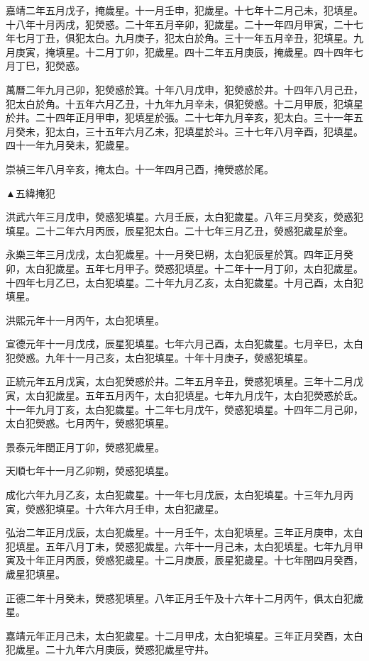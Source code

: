 \begin{pinyinscope}
嘉靖二年五月戊子，掩歲星。十一月壬申，犯歲星。十七年十二月己未，犯填星。十八年十月丙戌，犯熒惑。二十年五月辛卯，犯歲星。二十一年四月甲寅，二十七年七月丁丑，俱犯太白。九月庚子，犯太白於角。三十一年五月辛丑，犯填星。九月庚寅，掩填星。十二月丁卯，犯歲星。四十二年五月庚辰，掩歲星。四十四年七月丁巳，犯熒惑。

萬曆二年九月己卯，犯熒惑於箕。十年八月戊申，犯熒惑於井。十四年八月己丑，犯太白於角。十五年六月乙丑，十九年九月辛未，俱犯熒惑。十二月甲辰，犯填星於井。二十四年正月甲申，犯填星於張。二十七年九月辛亥，犯太白。三十一年五月癸未，犯太白，三十五年六月乙未，犯填星於斗。三十七年八月辛酉，犯填星。四十一年九月癸未，犯歲星。

崇禎三年八月辛亥，掩太白。十一年四月己酉，掩熒惑於尾。

▲五緯掩犯

洪武六年三月戊申，熒惑犯填星。六月壬辰，太白犯歲星。八年三月癸亥，熒惑犯填星。二十二年六月丙辰，辰星犯太白。二十七年三月乙丑，熒惑犯歲星於奎。

永樂三年三月戊戌，太白犯歲星。十一月癸巳朔，太白犯辰星於箕。四年正月癸卯，太白犯歲星。五年七月甲子。熒惑犯填星。十二年十一月丁卯，太白犯歲星。十四年七月乙巳，太白犯填星。二十年九月乙亥，太白犯歲星。十月己酉，太白犯填星。

洪熙元年十一月丙午，太白犯填星。

宣德元年十一月戊戌，辰星犯填星。七年六月己酉，太白犯歲星。七月辛巳，太白犯熒惑。九年十一月己亥，太白犯填星。十年十月庚子，熒惑犯填星。

正統元年五月戊寅，太白犯熒惑於井。二年五月辛丑，熒惑犯填星。三年十二月戊寅，太白犯歲星。五年五月丙午，太白犯填星。七年九月戊午，太白犯熒惑於氐。十一年九月丁亥，太白犯歲星。十二年七月戊午，熒惑犯填星。十四年二月己卯，太白犯熒惑。七月丙午，熒惑犯填星。

景泰元年閏正月丁卯，熒惑犯歲星。

天順七年十一月乙卯朔，熒惑犯填星。

成化六年九月乙亥，太白犯歲星。十一年七月戊辰，太白犯填星。十三年九月丙寅，熒惑犯填星。十六年六月壬申，太白犯歲星。

弘治二年正月戊辰，太白犯歲星。十一月壬午，太白犯填星。三年正月庚申，太白犯填星。五年八月丁未，熒惑犯歲星。六年十一月己未，太白犯填星。七年九月甲寅及十年正月丙辰，熒惑犯歲星。十二月庚辰，辰星犯歲星。十七年閏四月癸酉，歲星犯填星。

正德二年十月癸未，熒惑犯填星。八年正月壬午及十六年十二月丙午，俱太白犯歲星。

嘉靖元年正月己未，太白犯歲星。十二月甲戌，太白犯填星。三年正月癸酉，太白犯歲星。二十九年六月庚辰，熒惑犯歲星守井。


\end{pinyinscope}
